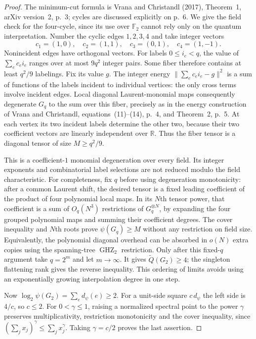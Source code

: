 \begin{proof}
The minimum-cut formula is Vrana and Christandl (2017),
Theorem~1, arXiv version~2, p.~3; cycles are discussed explicitly
on p.~6. We give the field check for the four-cycle, since its use
over $\mathbb F_2$ cannot rely only on the quantum interpretation.
Number the cyclic edges $1,2,3,4$ and take integer vectors
\[
 c_1=(1,0),\quad c_2=(1,1),\quad
 c_3=(0,1),\quad c_4=(1,-1).
\]
Nonincident edges have orthogonal vectors. For labels
$0\leq i_e<q$, the value of $\sum_e c_e i_e$ ranges over at
most $9q^2$ integer pairs. Some fiber therefore contains at least
$q^2/9$ labelings. Fix its value $g$. The integer energy
$\|\sum_e c_e i_e-g\|^2$ is a sum of functions of the labels
incident to individual vertices: the only cross terms involve
incident edges. Local diagonal Laurent-monomial maps consequently
degenerate $G_q$ to the sum over this fiber, precisely as in the
energy construction of Vrana and Christandl, equations~(11)--(14),
p.~4, and Theorem~2, p.~5. At each vertex its two incident labels
determine the other two, because their two coefficient vectors
are linearly independent over $\mathbb R$. Thus the fiber tensor
is a diagonal tensor of size $M\geq q^2/9$.

This is a coefficient-$1$ monomial degeneration over every field.
Its integer exponents and combinatorial label selections are not
reduced modulo the field characteristic. For completeness, fix $q$
before using degeneration monotonicity: after a common Laurent
shift, the desired tensor is a fixed leading coefficient of the
product of four polynomial local maps. In its $N$th tensor power,
that coefficient is a sum of $O_q(N^3)$ restrictions of
$G_q^{\otimes N}$, by expanding the four grouped polynomial maps
and summing their coefficient degrees. The cover inequality and
$N$th roots prove $\psi(G_q)\geq M$ without any restriction on
field size. Equivalently, the polynomial diagonal overhead can be
absorbed in $o(N)$ extra copies using the spanning-tree
$\operatorname{GHZ}_2$ restriction. Only after this fixed-$q$
argument take $q=2^m$ and let $m\to\infty$. It gives
$\widetilde Q(G_2)\geq4$; the singleton flattening rank gives the
reverse inequality. This ordering of limits avoids using an
exponentially growing interpolation degree in one step.

Now $\log_2\psi(G_2)=\sum_e d_\psi(e)\geq2$.
For a unit-side square $c\,d_\psi$ the left side is $4/c$, so
$c\leq2$. For $0<\gamma\leq1$, raising a normalized spectral
point to the power $\gamma$ preserves multiplicativity,
restriction monotonicity and the cover inequality, since
$(\sum_j x_j)^\gamma\leq\sum_j x_j^\gamma$.
Taking $\gamma=c/2$ proves the last assertion.
\end{proof}

